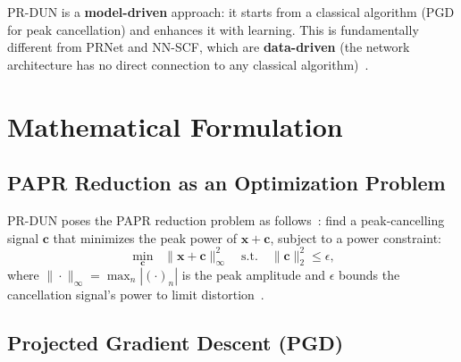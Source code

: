 \begin{keyinsight}
    PR-DUN is a \textbf{model-driven} approach: it starts from a classical
    algorithm (PGD for peak cancellation) and enhances it with learning.
    This is fundamentally different from PRNet and NN-SCF, which are
    \textbf{data-driven} (the network architecture has no direct connection
    to any classical algorithm)~\cite{nguyen2022deep}.
\end{keyinsight}


\section{Mathematical Formulation}
\label{sec:prdun_formulation}

\subsection{PAPR Reduction as an Optimization Problem}

PR-DUN poses the PAPR reduction problem as
follows~\cite{nguyen2022deep}: find a peak-cancelling signal $\bm{c}$
that minimizes the peak power of $\bm{x} + \bm{c}$,
subject to a power constraint:
\begin{equation}
    \min_{\bm{c}} \;\; \|\bm{x} + \bm{c}\|_\infty^2
    \quad \text{s.t.} \quad \|\bm{c}\|_2^2 \le \epsilon,
    \label{eq:prdun_optimization}
\end{equation}
where $\|\cdot\|_\infty = \max_n |(\cdot)_n|$ is the peak amplitude
and $\epsilon$ bounds the cancellation signal's power to limit
distortion~\cite{nguyen2022deep}.

\subsection{Projected Gradient Descent (PGD)}

